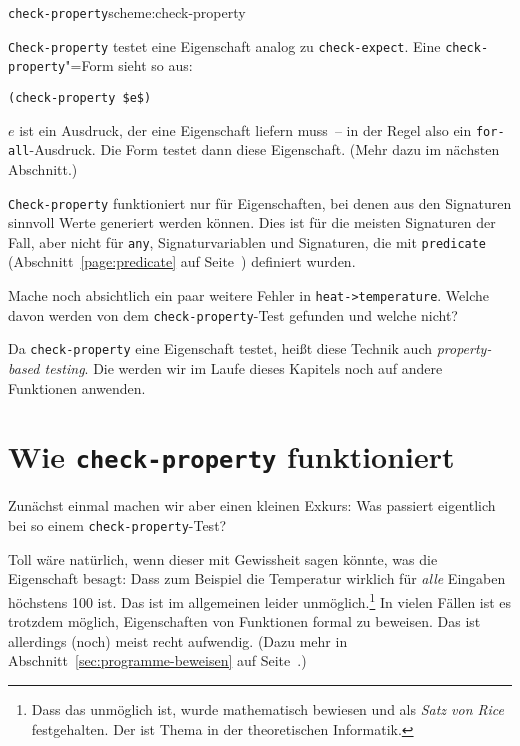 \begin{feature}{\lstinline{check-property}}{scheme:check-property}

\lstinline{Check-property}
testet eine Eigenschaft analog zu \lstinline{check-expect}.  Eine
\lstinline{check-property}"=Form sieht so aus:
%
\begin{lstlisting}
(check-property $e$) 
\end{lstlisting}
%
$e$ ist ein Ausdruck, der eine Eigenschaft liefern muss~-- in der Regel
also ein \lstinline{for-all}-Ausdruck.  Die Form testet dann diese
Eigenschaft.  (Mehr dazu im nächsten Abschnitt.)

\lstinline{Check-property} funktioniert nur für Eigenschaften, bei
denen aus den Signaturen sinnvoll Werte generiert werden können.  Dies
ist für die meisten Signaturen der Fall, aber nicht für \lstinline{any},
Signaturvariablen und Signaturen, die mit \lstinline{predicate}
(Abschnitt~\ref{page:predicate} auf Seite~\pageref{page:predicate})
definiert wurden.
\end{feature}

\begin{aufgabeinline}
  Mache noch absichtlich ein paar weitere Fehler in
  \lstinline{heat->temperature}.  Welche davon werden von dem
  \lstinline{check-property}-Test gefunden und welche nicht?
\end{aufgabeinline}

Da \lstinline{check-property} eine Eigenschaft testet, heißt diese
Technik auch \textit{property-based testing}.  Die werden wir im Laufe dieses Kapitels noch auf andere
Funktionen anwenden.

\section{Wie \lstinline{check-property} funktioniert}

Zunächst einmal machen wir aber einen kleinen Exkurs: Was passiert
eigentlich bei so einem \lstinline{check-property}-Test?

Toll wäre natürlich, wenn dieser mit Gewissheit sagen könnte, was die
Eigenschaft besagt: Dass zum Beispiel die Temperatur wirklich für
\emph{alle} Eingaben höchstens 100 ist.  Das ist im allgemeinen leider
unmöglich.\footnote{Dass das unmöglich ist, wurde mathematisch
  bewiesen und als \textit{Satz von Rice} festgehalten.  Der ist Thema
  in der theoretischen Informatik.}  In vielen Fällen ist es trotzdem
möglich, Eigenschaften von Funktionen formal zu beweisen.  Das ist
allerdings (noch) meist recht aufwendig.  (Dazu mehr in
Abschnitt~\ref{sec:programme-beweisen} auf
Seite~\pageref{sec:programme-beweisen}.)

